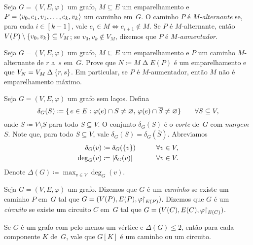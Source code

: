 \documentclass[10pt,reqno]{amsart}
\begin{document}
Seja \(G = (V,E,\varphi)\) um grafo, \(M \subseteq E\) um
emparelhamento e \(P = \langle v_0,e_1,v_1,\dotsc,e_k,v_k\rangle\) um caminho
em~\(G\).  O caminho \(P\) é \emph{\(M\)-alternante} se, para cada
\(i \in [k-1]\), vale \(e_i \in M \iff e_{i+1} \not\in M\).  Se \(P\)
é \(M\)-alternante, então
\(V(P) \setminus \{v_0,v_k\} \subseteq V_M\); se \(v_0,v_k \not\in
V_M\), dizemos que \(P\) é \emph{\(M\)-aumentador}.

\begin{exercise}
  \label{ex:6}
  Seja \(G = (V,E,\varphi)\) um grafo, \(M \subseteq E\) um
  emparelhamento e \(P\) um caminho \(M\)-alternante de \(r\) a~\(s\)
  em~\(G\).  Prove que \(N \coloneqq M \mathbin{\Delta} E(P)\) é um
  emparelhamento e que \(V_N = V_M \mathbin{\Delta} \{r,s\}\).  Em
  particular, se \(P\) é \(M\)-aumentador, então \(M\) não é
  emparelhamento máximo.
\end{exercise}

Seja \(G = (V,E,\varphi)\) um grafo sem laços.  Defina
\begin{equation*}
  \delta_G(S)
  \coloneqq
  \{\,{
    e \in E
  }\,\colon{
    \varphi(e) \cap S \neq \varnothing,\,
    \varphi(e) \cap \overline{S} \neq \varnothing}\}
  \qquad
  \forall S \subseteq V,
\end{equation*}
onde \(\overline{S} \coloneqq V \setminus S\) para todo
\(S \subseteq V\).  O conjunto \(\delta_G(S)\) é o \emph{corte}
de~\(G\) com \emph{margem}~\(S\).  Note que, para todo
\(S \subseteq V\), vale \(\delta_G(S) = \delta_G(\overline{S})\).
Abreviamos
\begin{alignat*}{2}
  \delta_G(v)
  & \coloneqq
  \delta_G(\{v\})
  & \qquad &
  \forall v \in V,
  \\
  \deg_G(v)
  & \coloneqq
  \lvert\delta_G(v)\rvert
  & \qquad &
  \forall v \in V.
\end{alignat*}
Denote \(\Delta(G) \coloneqq \max_{v \in V} \deg_G(v)\).

Seja \(G = (V,E,\varphi)\) um grafo.  Dizemos que \(G\) é um
\emph{caminho} se existe um caminho \(P\) em~\(G\) tal que
\(G = (V(P),E(P),\varphi\mathord{\restriction}_{E(P)})\).  Dizemos que \(G\) é um
\emph{circuito} se existe um circuito \(C\) em~\(G\) tal que
\(G = (V(C),E(C),\varphi\mathord{\restriction}_{E(C)})\).

\begin{exercise}
  \label{ex:7}
  Se \(G\) é um grafo com pelo menos um vértice e
  \(\Delta(G) \leq 2\), então para cada componente \(K\) de~\(G\),
  vale que \(G[K]\) é um caminho ou um circuito.
\end{exercise}
\end{document}
